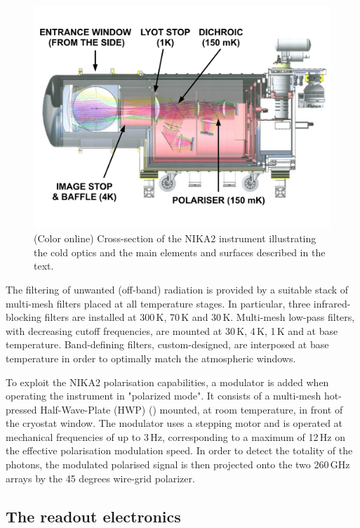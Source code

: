 \documentclass[]{aa} %
\begin{document}
\begin{figure}[h]
   \centering
   \includegraphics[width=.95\linewidth]{NIKA2_optics.pdf}
      \caption{(Color online) Cross-section of the NIKA2 instrument illustrating the cold optics and the main elements and surfaces described in the text.}
         \label{Cryostat_optics}
\end{figure}

The filtering of unwanted (off-band) radiation is provided by a suitable stack of multi-mesh filters placed at all temperature stages. In particular, three infrared-blocking filters are installed at 300\,K, 70\,K and 30\,K. Multi-mesh low-pass filters, with decreasing cutoff frequencies, are mounted at 30\,K, 4\,K, 1\,K and at base temperature. Band-defining filters, custom-designed, are interposed at base temperature in order to optimally match the atmospheric windows. 

To exploit the NIKA2 polarisation capabilities, a modulator is added when operating the instrument in "polarized mode". It consists of a multi-mesh hot-pressed Half-Wave-Plate (HWP) (\cite{Pisano2016}) mounted, at room temperature, in front of the cryostat window. The modulator uses a stepping motor and is operated at mechanical frequencies of up to 3\,Hz, corresponding to a maximum of 12\,Hz on the effective polarisation modulation speed. In order to detect the totality of the photons, the modulated polarised signal is then projected onto the two 260\,GHz arrays by the 45 degrees wire-grid polarizer.  


 \subsection{The readout electronics}
\end{document}
